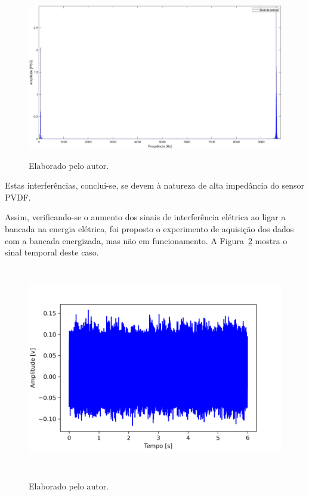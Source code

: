 \documentclass[
	12pt,				
	oneside,			
	a4paper,			
	english,			
	brazil,			
	]{abntex2ppgsi}
\begin{document}
{{{\begin{figure}[!htb]
\centering
\caption {Elaborado pelo autor.}
\includegraphics[width=170mm,keepaspectratio]{Caso0/PSD_SENSOR_MAQUINA_LIGADA}
\label{PSD_SENSOR_MAQUINA_LIGADA}
\end{figure} 

Estas interferências, conclui-se, se devem à natureza de alta impedância do sensor PVDF.  

Assim, verificando-se o aumento dos sinais de interferência elétrica ao ligar a bancada na energia elétrica, foi proposto o experimento de aquisição dos dados com a bancada energizada, mas não em funcionamento. A Figura~\ref{maquina_ligada_na_tomada_e_energizada} mostra o sinal temporal deste caso.

\begin{figure}[H]
\centering
\caption {Elaborado pelo autor.}
\includegraphics[width=\textwidth,height=90mm,keepaspectratio]{Caso0/maquina_ligada_na_tomada_e_energizada}
\label{maquina_ligada_na_tomada_e_energizada}
\end{figure} 

}}}
\end{document}
